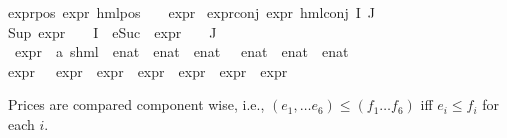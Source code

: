 \begin{isabellebody}
expr{\isacharunderscore}{\kern0pt}{}{\isacharunderscore}{\kern0pt}pos{\isacharcolon}{\kern0pt}\ {\isacartoucheopen}expr{\isacharunderscore}{\kern0pt}{}\ {\isacharparenleft}{\kern0pt}hml{\isacharunderscore}{\kern0pt}pos\ {\isasymalpha}\ {\isasymphi}{\isacharparenright}{\kern0pt}\ {\isacharequal}{\kern0pt}\ expr{\isacharunderscore}{\kern0pt}{}\ {\isasymphi}{\isacartoucheclose}{\isacharbar}{\kern0pt}\isanewline
expr{\isacharunderscore}{\kern0pt}{}{\isacharunderscore}{\kern0pt}conj{\isacharcolon}{\kern0pt}\ {\isacartoucheopen}expr{\isacharunderscore}{\kern0pt}{}\ {\isacharparenleft}{\kern0pt}hml{\isacharunderscore}{\kern0pt}conj\ I\ J\ {\isasymPhi}{\isacharparenright}{\kern0pt}\ {\isacharequal}{\kern0pt}\ \isanewline
{\isacharparenleft}{\kern0pt}Sup\ {\isacharparenleft}{\kern0pt}{\isacharparenleft}{\kern0pt}expr{\isacharunderscore}{\kern0pt}{}\ {\isasymcirc}\ {\isasymPhi}{\isacharparenright}{\kern0pt}\ {\isacharbackquote}{\kern0pt}\ I\ {\isasymunion}\ {\isacharparenleft}{\kern0pt}{\isacharparenleft}{\kern0pt}eSuc\ {\isasymcirc}\ expr{\isacharunderscore}{\kern0pt}{}\ {\isasymcirc}\ {\isasymPhi}{\isacharparenright}{\kern0pt}\ {\isacharbackquote}{\kern0pt}\ J{\isacharparenright}{\kern0pt}{\isacharparenright}{\kern0pt}{\isacharparenright}{\kern0pt}{\isacartoucheclose}\isanewline
\isanewline
{}\isamarkupfalse%
\ expr\ {\isacharcolon}{\kern0pt}{\isacharcolon}{\kern0pt}\ {\isachardoublequoteopen}{\isacharparenleft}{\kern0pt}{\isacharprime}{\kern0pt}a{\isacharcomma}{\kern0pt}\ {\isacharprime}{\kern0pt}s{\isacharparenright}{\kern0pt}hml\ {\isasymRightarrow}\ enat\ {\isasymtimes}\ enat\ {\isasymtimes}\ enat\ {\isasymtimes}\ \ enat\ {\isasymtimes}\ enat\ {\isasymtimes}\ enat{\isachardoublequoteclose}\ \isanewline
\ \ \isanewline
{\isacartoucheopen}expr\ {\isasymphi}\ {\isacharequal}{\kern0pt}\ {\isacharparenleft}{\kern0pt}expr{\isacharunderscore}{\kern0pt}{}\ {\isasymphi}{\isacharcomma}{\kern0pt}\ expr{\isacharunderscore}{\kern0pt}{}\ {\isasymphi}{\isacharcomma}{\kern0pt}\ expr{\isacharunderscore}{\kern0pt}{}\ {\isasymphi}{\isacharcomma}{\kern0pt}\ expr{\isacharunderscore}{\kern0pt}{}\ {\isasymphi}{\isacharcomma}{\kern0pt}\ expr{\isacharunderscore}{\kern0pt}{}\ {\isasymphi}{\isacharcomma}{\kern0pt}\ expr{\isacharunderscore}{\kern0pt}{}\ {\isasymphi}{\isacharparenright}{\kern0pt}{\isacartoucheclose}%
\begin{isamarkuptext}%
Prices are compared component wise, i.e., $(e_1, \ldots e_6) \leq (f_1 \ldots f_6)$ iff $e_i \leq f_i$ for each $i$.%

\end{isamarkuptext}
\end{isabellebody}
